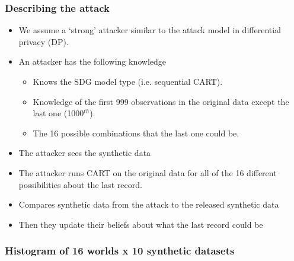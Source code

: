 \documentclass[t,8pt,utfx8]{beamer}
\begin{document}
\begin{spacing}{1.25}
\begin{frame}[c,plain]
\end{frame}

\begin{frame}[t]\frametitle{Describing the attack}

\begin{itemize}
    \item We assume a `strong' attacker similar to the attack model in differential privacy (DP). 
    \item An attacker has the following knowledge
    \begin{itemize}
        \item Knows the SDG model type (i.e. sequential CART).
        \item Knowledge of the first 999 observations in the original data except the last one (1000$^{th}$).  
        \item The 16 possible combinations that the last one could be.
    \end{itemize}
    \item The attacker sees the synthetic data
    \item The attacker runs CART on the original data for all of the 16 different possibilities about the last record.
    \item Compares synthetic data from the attack to the released synthetic data  
    \item Then they update their beliefs about what the last record could be
\end{itemize}

\end{frame}

\begin{frame}[t]\frametitle{Histogram of 16 worlds x 10 synthetic datasets}

\begin{figure}
    \caption{}
    \vskip -4mm
    \label{fig:attacker_default}
\end{figure}



\end{frame}
\end{spacing}
\end{document}
